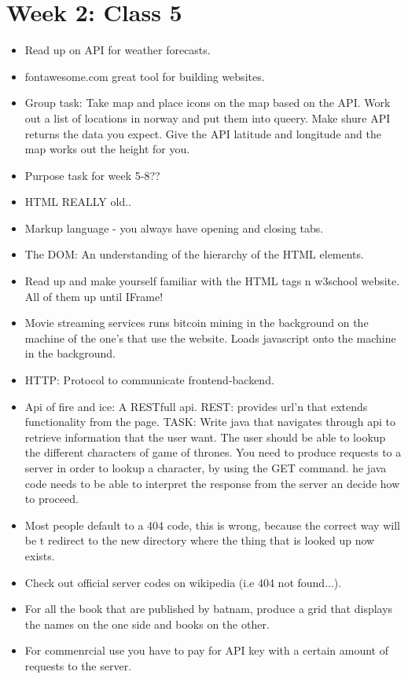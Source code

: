 \documentclass[]{article}
\begin{document}
\section{Week 2: Class 5}
\begin{itemize}
	\item Read up on API for weather forecasts.
	\item fontawesome.com great tool for building websites.
	\item Group task: Take map and place icons on the map based on the API. Work out a list of locations in norway and put them into queery. Make shure API returns the data you expect. Give the API latitude and longitude and the map works out the height for you. 
	\item Purpose task for week 5-8??
	\item HTML REALLY old..
	\item Markup language - you always have opening and closing tabs.
	\item The DOM: An understanding of the hierarchy of the HTML elements.
	\item Read up and make yourself familiar with the HTML tags n w3school website. All of them up until IFrame!
	\item Movie streaming services runs bitcoin mining in the background on the machine of the one's that use the website. Loads javascript onto the machine in the background.
	\item HTTP: Protocol to communicate frontend-backend.
	\item Api of fire and ice: A RESTfull api. REST: provides url'n that extends functionality from the page. TASK: Write java that navigates through api to retrieve information that the user want. The user should be able to lookup the different characters of game of thrones. You need to produce requests to a server in order to lookup a character, by using the GET command. he java code needs to be able to interpret the response from the server an decide how to proceed. 
	\item Most people default to a 404 code, this is wrong, because the correct way will be t redirect to the new directory where the thing that is looked up now exists. 
	\item Check out official server codes on wikipedia (i.e 404 not found...).
	\item For all the book that are published by batnam, produce a grid that displays the names on the one side and books on the other. 
	\item For commenrcial use you have to pay for API key with a certain amount of requests to the server. 
\end{itemize}
\end{document}
